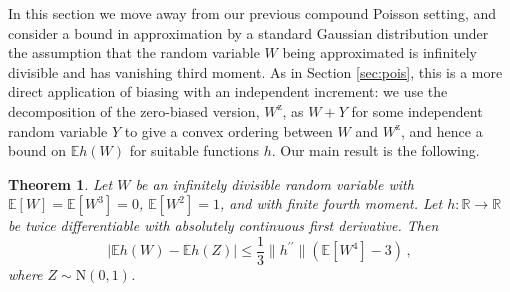 \documentclass[12pt]{article}
\newtheorem{theorem}{Theorem}
\begin{document}
In this section we move away from our previous compound Poisson setting, and consider a bound in approximation by a standard Gaussian distribution under the assumption that the random variable $W$ being approximated is infinitely divisible and has vanishing third moment. As in Section \ref{sec:pois}, this is a more direct application of biasing with an independent increment: we use the decomposition of the zero-biased version, $W^\text{z}$, as $W+Y$ for some independent random variable $Y$ to give a convex ordering between $W$ and $W^\text{z}$, and hence a bound on $\mathbb{E}h(W)$ for suitable functions $h$. Our main result is the following.
\begin{theorem}\label{thm:ThirdMom}
Let $W$ be an infinitely divisible random variable with $\mathbb{E}[W]=\mathbb{E}[W^3]=0$, $\mathbb{E}[W^2]=1$, and with finite fourth moment. Let $h:\mathbb{R}\to\mathbb{R}$ be twice differentiable with absolutely continuous first derivative. Then
\[
|\mathbb{E}h(W)-\mathbb{E}h(Z)|\leq\frac{1}{3}\lVert h^{\prime\prime}\rVert\left(\mathbb{E}[W^4]-3\right)\,,
\]
where $Z\sim\text{N}(0,1)$.
\end{theorem}
\end{document}

